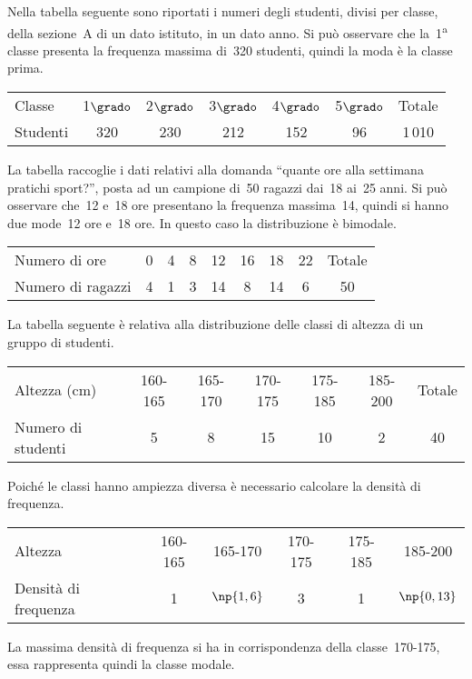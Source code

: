 \begin{exrig}
 \begin{esempio}

 Nella tabella seguente sono riportati i numeri degli studenti, divisi per classe, della sezione~A di un dato istituto,
 in un dato anno. Si può osservare che la~1\textsuperscript{a} classe presenta la frequenza massima di~320 studenti, quindi la moda è la classe prima.
\begin{center}
\begin{tabular}{lcccccc}
\toprule
Classe & 1$\grado$ & 2$\grado$ & 3$\grado$ & 4$\grado$ & 5$\grado$ & Totale \\
Studenti & 320 & 230 & 212 & 152 & 96 & 1\,010 \\
\bottomrule
\end{tabular}
\end{center}
 \end{esempio}

\begin{esempio}
La tabella raccoglie i dati relativi alla domanda ``quante ore alla settimana pratichi sport?'', posta ad un
campione di~50 ragazzi dai~18 ai~25 anni. Si può osservare che~12 e~18 ore presentano la frequenza massima~14, quindi si hanno due
mode~12 ore e~18 ore. In questo caso la distribuzione è bimodale.


\begin{center}
\begin{tabular}{lcccccccc}
\toprule
Numero di ore & 0 &4 &8 &12 &16 &18 &22 &Totale\\
 Numero di ragazzi& 4 & 1 & 3 & 14 & 8 & 14 & 6 & 50 \\
\bottomrule
\end{tabular}
\end{center}
 \end{esempio}

 \begin{esempio}
La tabella seguente è relativa alla distribuzione delle classi di altezza di un gruppo di studenti.

\begin{center}
\begin{tabular}{lcccccc}
\toprule
Altezza (cm) &160-165 &165-170 &170-175 &175-185 &185-200 &Totale \\
Numero di studenti & 5 & 8 & 15 & 10 & 2 & 40 \\
\bottomrule
\end{tabular}
\end{center}
Poiché le classi hanno ampiezza diversa è necessario calcolare la densità di frequenza.

\begin{center}
\begin{tabular}{lccccc}
\toprule
Altezza &160-165 &165-170 &170-175 &175-185 &185-200 \\
Densità di frequenza & 1 & $\np{1,6}$ & 3 & 1 & $\np{0,13}$ \\
\bottomrule
\end{tabular}
\end{center}
La massima densità di frequenza si ha in corrispondenza della classe~170-175, essa rappresenta quindi la classe modale.
 \end{esempio}
\end{exrig}

